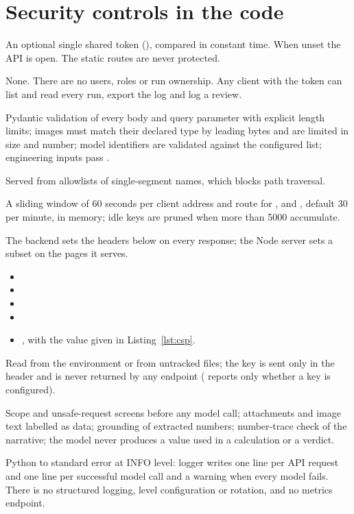 \section{Security controls in the code}
\begin{description}[leftmargin=3.4cm,style=nextline]
  \item[Authentication] An optional single shared token (), compared in constant time. When unset the API is open. The static routes are never protected.
  \item[Authorisation] None. There are no users, roles or run ownership. Any client with the token can list and read every run, export the log and log a review.
  \item[Input validation] Pydantic validation of every body and query parameter with explicit length limits; images must match their declared type by leading bytes and are limited in size and number; model identifiers are validated against the configured list; engineering inputs pass .
  \item[Static files] Served from allowlists of single-segment names, which blocks path traversal.
  \item[Rate limiting] A sliding window of 60 seconds per client address and route for ,  and , default 30 per minute, in memory; idle keys are pruned when more than 5000 accumulate.
  \item[Response headers] The backend sets the headers below on every response; the Node server sets a subset on the pages it serves.
    \begin{itemize}
      \item {}
      \item {}
      \item {}
      \item {}
      \item {}, with the value given in Listing~\ref{lst:csp}.
    \end{itemize}
  \item[Secrets] Read from the environment or from untracked  files; the key is sent only in the  header and is never returned by any endpoint ( reports only whether a key is configured).
  \item[Model-facing controls] Scope and unsafe-request screens before any model call; attachments and image text labelled as data; grounding of extracted numbers; number-trace check of the narrative; the model never produces a value used in a calculation or a verdict.
  \item[Logging] Python  to standard error at INFO level: logger  writes one line per API request and  one line per successful model call and a warning when every model fails. There is no structured logging, level configuration or rotation, and no metrics endpoint.
\end{description}

